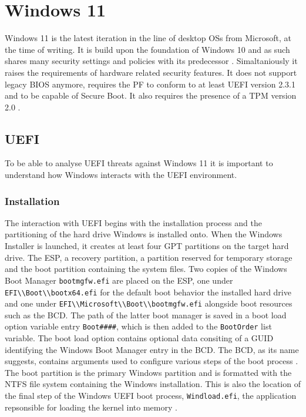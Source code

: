 

\chapter{Windows 11}

Windows 11 is the latest iteration in the line of desktop \acp{OS} from Microsoft, at the time of writing.
It is build upon the foundation of Windows 10 and as such shares many security settings and policies with its predecessor \cite{microsoft-windows-11-overview}.
Simaltaniously it raises the requirements of hardware related security features.
It does not support legacy \ac{BIOS} anymore, requires the \ac{PF} to conform to at least \ac{UEFI} version 2.3.1 and to be capable of Secure Boot.
It also requires the presence of a \ac{TPM} version 2.0 \cite{microsoft-windows-minimum-hardware-requirements-overview}.

\section{\acs{UEFI}}

To be able to analyse \ac{UEFI} threats against Windows 11 it is important to understand how Windows interacts with the \ac{UEFI} environment.

\subsection{Installation}

The interaction with \ac{UEFI} begins with the installation process and the partitioning of the hard drive Windows is installed onto.
When the Windows Installer is launched, it creates at least four \ac{GPT} partitions on the target hard drive.
The \acf{ESP}, a recovery partition, a partition reserved for temporary storage and the boot partition containing the system files.
Two copies of the Windows Boot Manager \lstinline{bootmgfw.efi} are placed on the \ac{ESP}, one under \lstinline{EFI\\Boot\\bootx64.efi} for the default boot behavior the installed hard drive and one under \lstinline{EFI\\Microsoft\\Boot\\bootmgfw.efi} alongside boot resources such as the \ac{BCD}.
The path of the latter boot manager is saved in a boot load option variable entry \lstinline{Boot####}, which is then added to the \lstinline{BootOrder} list variable.
The boot load option contains optional data consiting of a GUID identifying the Windows Boot Manager entry in the \ac{BCD}.
The \ac{BCD}, as its name suggests, contains arguments used to configure various steps of the boot process \cite[Section 12]{windows-internals-7-part2}.
The boot partition is the primary Windows partition and is formatted with the \ac{NTFS} file system containing the Windows installation.
This is also the location of the final step of the Windows UEFI boot process, \lstinline{Windload.efi}, the application repsonsible for loading the kernel into memory \cite[12. The Windows OS Loader]{windows-internals-7-part2}.

